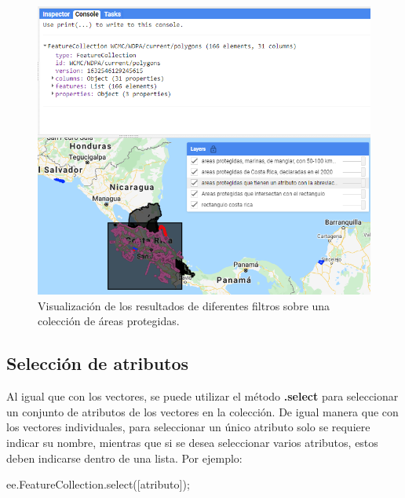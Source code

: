 \documentclass[
  12pt,
  letterpaper,
  twoside]{book}
\newenvironment{Shaded}{\begin{snugshade}}{\end{snugshade}}
\newcommand{\AttributeTok}[1]{\textcolor[rgb]{0.48,0.12,0.64}{#1}}
\newcommand{\FunctionTok}[1]{\textcolor[rgb]{0.48,0.12,0.64}{#1}}
\newcommand{\NormalTok}[1]{#1}
\newcommand{\OperatorTok}[1]{\textcolor[rgb]{0.00,0.00,0.00}{#1}}
\newcommand{\StringTok}[1]{\textcolor[rgb]{0.87,0.29,0.22}{#1}}
\newcommand\boldpurple[1]{\textcolor{darkpurple}{\textbf{#1}}}
\begin{document}
\begin{figure}[H]

{\centering \includegraphics[width=0.95\linewidth]{Img/ej18} 

}

\caption{Visualización de los resultados de diferentes filtros sobre una colección de áreas protegidas.}\label{fig:f86}
\end{figure}

\hypertarget{selecciuxf3n-de-atributos}{%
\subsection*{Selección de atributos}\label{selecciuxf3n-de-atributos}}

Al igual que con los vectores, se puede utilizar el método \boldpurple{.select} para seleccionar un conjunto de atributos de los vectores en la colección. De igual manera que con los vectores individuales, para seleccionar un único atributo solo se requiere indicar su nombre, mientras que si se desea seleccionar varios atributos, estos deben indicarse dentro de una lista. Por ejemplo:

\begin{Shaded}
\begin{Highlighting}[]
\NormalTok{ee}\OperatorTok{.}\AttributeTok{FeatureCollection}\OperatorTok{.}\FunctionTok{select}\NormalTok{([}\StringTok{\textquotesingle{}atributo\textquotesingle{}}\NormalTok{])}\OperatorTok{;}
\end{Highlighting}
\end{Shaded}
\end{document}
